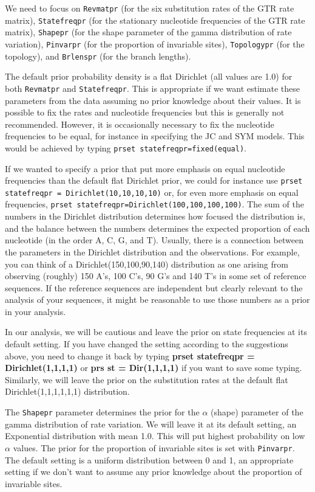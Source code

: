 \documentclass[12pt]{book}
\begin{document}
We need to focus on \texttt{Revmatpr} (for the six substitution rates of the GTR rate matrix),
 \texttt{Statefreqpr} (for the stationary nucleotide frequencies of the GTR rate matrix), \texttt{Shapepr}
 (for the shape parameter of the gamma distribution of rate variation), \texttt{Pinvarpr}
 (for the proportion of invariable sites), \texttt{Topologypr} (for the topology), and \texttt{Brlenspr}
 (for the branch lengths).

The default prior probability density is a flat Dirichlet (all values are 1.0) for both \texttt{Revmatpr}
 and \texttt{Statefreqpr}. This is appropriate if we want estimate these parameters from the data assuming
 no prior knowledge about their values. It is possible to fix the rates and nucleotide frequencies but this
 is generally not recommended. However, it is occasionally necessary to fix the nucleotide frequencies to
 be equal, for instance in specifying the JC and SYM models. This would be achieved by typing
 \texttt{prset statefreqpr=fixed(equal)}.

If we wanted to specify a prior that put more emphasis on equal nucleotide frequencies than the default
 flat Dirichlet prior, we could for instance use \texttt{prset statefreqpr = Dirichlet(10,10,10,10)} or,
 for even more emphasis on equal frequencies, \texttt{prset statefreqpr=Dirichlet(100,100,100,100)}. The
 sum of the numbers in the Dirichlet distribution determines how focused the distribution is, and the
 balance between the numbers determines the expected proportion of each nucleotide (in the order A, C, G,
 and T). Usually, there is a connection between the parameters in the Dirichlet distribution and the
 observations. For example, you can think of a Dirichlet(150,100,90,140) distribution as one arising from
 observing (roughly) 150 A's, 100 C's, 90 G's and 140 T's in some set of reference sequences. If the
 reference sequences are independent but clearly relevant to the analysis of your sequences, it might be
 reasonable to use those numbers as a prior in your analysis. 

In our analysis, we will be cautious and leave the prior on state frequencies at its default setting. If you
 have changed the setting according to the suggestions above, you need to change it back by typing
 \textbf{prset statefreqpr = Dirichlet(1,1,1,1)} or \textbf{prs st = Dir(1,1,1,1)} if you want to save some
 typing. Similarly, we will leave the prior on the substitution rates at the default flat
 Dirichlet(1,1,1,1,1,1) distribution.

The \texttt{Shapepr} parameter determines the prior for the $\alpha$ (shape) parameter of the gamma
 distribution of rate variation. We will leave it at its default setting, an Exponential distribution
 with mean 1.0. This will put highest probability on low $\alpha$ values. 
 The prior for the proportion of invariable sites is set with \texttt{Pinvarpr}. The default setting
 is a uniform distribution between 0 and 1, an appropriate setting if we don't want to assume any prior
 knowledge about the proportion of invariable sites.
\end{document}
